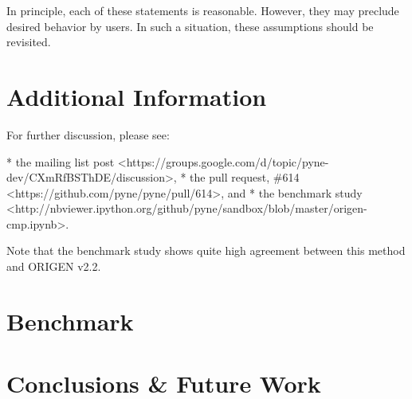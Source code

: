 \documentclass{anstrans}
\begin{document}
In principle, each of these statements is reasonable. However, they
may preclude desired behavior by users. In such a situation, these 
assumptions should be revisited.

\section{Additional Information}
For further discussion, please see:

* the mailing list post <https://groups.google.com/d/topic/pyne-dev/CXmRfBSThDE/discussion>, 
* the pull request, \#614 <https://github.com/pyne/pyne/pull/614>, and
* the benchmark study <http://nbviewer.ipython.org/github/pyne/sandbox/blob/master/origen-cmp.ipynb>.

Note that the benchmark study shows quite high agreement between this method
and ORIGEN v2.2.

\section{Benchmark}

\section{Conclusions \& Future Work}




\end{document}
